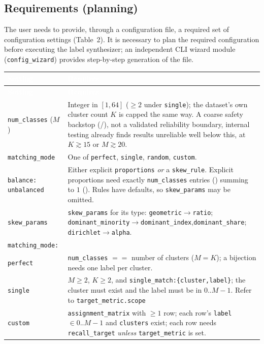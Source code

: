\documentclass[a4paper,11pt]{article}
\newcommand{\vcode}[1]{\textcolor{valred}{\bfseries\ttfamily #1}}
\newcommand{\headrow}{\rowcolor{headblue}}
\newcommand{\hc}[1]{\textcolor{white}{\bfseries #1}}
\begin{document}
\subsection{\texorpdfstring{\quad Requirements}{Requirements} (planning)}
The user needs to provide, through a configuration file, a required set of configuration settings (Table~2). It is necessary to plan the required configuration before executing the label synthesizer; an independent CLI wizard module (\texttt{config\_wizard}) provides step-by-step generation of the file.

\begin{longtable}{@{}L{4.2cm} L{12.0cm}@{}}
\toprule
\headrow \hc{Setting} & \hc{Requires} \\
\midrule
\endfirsthead
\headrow \hc{Setting} & \hc{Requires} \\ \midrule
\endhead
\texttt{num\_classes} ($M$) & Integer in $[1,64]$ ($\geq 2$ under \texttt{single}); the dataset's own cluster count $K$ is capped the same way. A coarse safety backstop (\vcode{126}/\vcode{127}), not a validated reliability boundary, internal testing already finds results unreliable well below this, at $K\gtrsim15$ or $M\gtrsim20$. \\
\texttt{matching\_mode} & One of \texttt{perfect}, \texttt{single}, \texttt{random}, \texttt{custom}. \\
\texttt{balance: unbalanced} & Either explicit \texttt{proportions} \emph{or} a \texttt{skew\_rule}. Explicit proportions need exactly \texttt{num\_classes} entries (\vcode{121}) summing to $1$ (\vcode{106}). Rules have defaults, so \texttt{skew\_params} may be omitted. \\
\texttt{skew\_params} & \texttt{skew\_params} for its type: \texttt{geometric}$\to$\texttt{ratio}; \texttt{dominant\_minority}$\to$\texttt{dominant\_index},\texttt{dominant\_share}; \texttt{dirichlet}$\to$\texttt{alpha}. \\
\texttt{matching\_mode:}\\
\texttt{perfect} & \texttt{num\_classes} $==$ number of clusters ($M=K$); a bijection needs one label per cluster.\\
\texttt{single} & $M\geq2$, $K\geq2$, and \texttt{single\_match:\{cluster,label\}}; the cluster must exist and the label must be in $0..M{-}1$. Refer to \texttt{target\_metric.scope} \\
\texttt{custom} & \texttt{assignment\_matrix} with $\geq1$ row; each row's \texttt{label}$\in 0..M{-}1$ and \texttt{clusters} exist; each row needs \texttt{recall\_target} \emph{unless} \texttt{target\_metric} is set. \\

\end{longtable}
\end{document}
